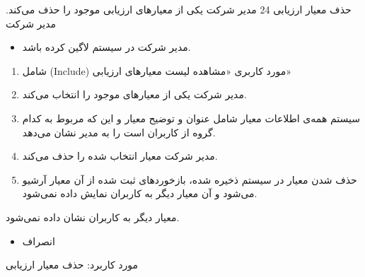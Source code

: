 {
\usecase
{
حذف معیار ارزیابی
}
{24}
{
	مدیر شرکت یکی از معیارهای ارزیابی موجود را حذف می‌کند.
}
{
	مدیر شرکت
}
{}
{
	\begin{itemize}
		\vspace*{-0.6cm}
		\item 
		مدیر شرکت در سیستم لاگین کرده باشد.
	\end{itemize}
}
{
	\begin{enumerate}
	\item 
	شامل (Include) مورد کاربری «مشاهده لیست معیارهای ارزیابی»
	\item
	مدیر شرکت یکی از معیارهای موجود را انتخاب می‌کند.
	\item 
	سیستم همه‌ی اطلاعات معیار شامل عنوان و توضیح معیار و این که مربوط به کدام گروه از کاربران است را به مدیر نشان می‌دهد.
	\item 
 مدیر شرکت معیار انتخاب شده را حذف می‌کند.
	\item 
حذف شدن معیار در سیستم ذخیره شده، بازخوردهای ثبت شده از آن معیار آرشیو می‌شود و آن معیار دیگر به کاربران نمایش داده نمی‌شود.
\end{enumerate}
}
{
معیار دیگر به کاربران نشان داده نمی‌شود.
}
{
	\begin{itemize}
		\vspace*{-0.6cm}
		\item 
		انصراف
	\end{itemize}
}
{
	مورد کاربرد: حذف معیار ارزیابی
}



}

